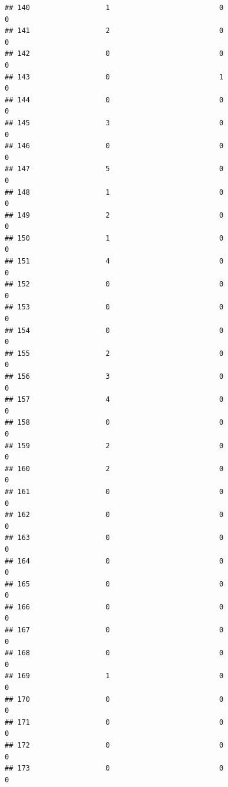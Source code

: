 \documentclass[
]{article}
\begin{document}
\begin{verbatim}
## 140                  1                          0                       0
## 141                  2                          0                       0
## 142                  0                          0                       0
## 143                  0                          1                       0
## 144                  0                          0                       0
## 145                  3                          0                       0
## 146                  0                          0                       0
## 147                  5                          0                       0
## 148                  1                          0                       0
## 149                  2                          0                       0
## 150                  1                          0                       0
## 151                  4                          0                       0
## 152                  0                          0                       0
## 153                  0                          0                       0
## 154                  0                          0                       0
## 155                  2                          0                       0
## 156                  3                          0                       0
## 157                  4                          0                       0
## 158                  0                          0                       0
## 159                  2                          0                       0
## 160                  2                          0                       0
## 161                  0                          0                       0
## 162                  0                          0                       0
## 163                  0                          0                       0
## 164                  0                          0                       0
## 165                  0                          0                       0
## 166                  0                          0                       0
## 167                  0                          0                       0
## 168                  0                          0                       0
## 169                  1                          0                       0
## 170                  0                          0                       0
## 171                  0                          0                       0
## 172                  0                          0                       0
## 173                  0                          0                       0

\end{verbatim}
\end{document}
